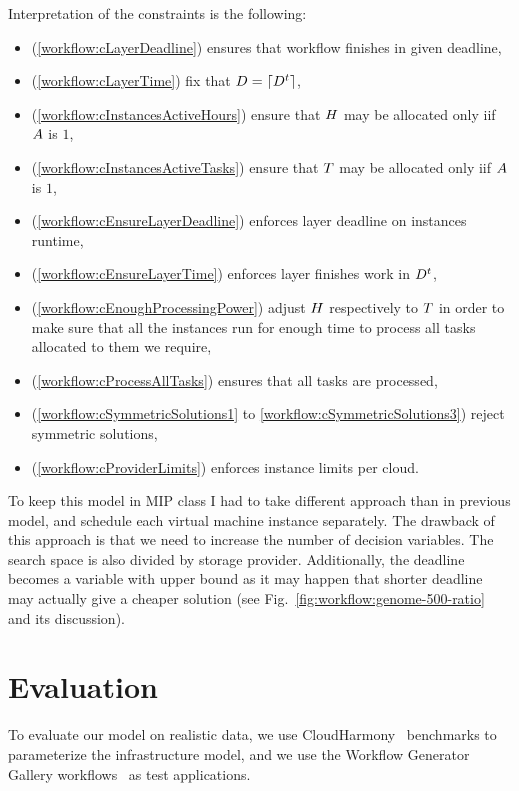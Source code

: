 {    Interpretation of the constraints is the following:
    \begin{itemize}
        \item(\ref{workflow:cLayerDeadline}) ensures that workflow finishes in given deadline,
        \item(\ref{workflow:cLayerTime}) fix that $D = \lceil D^t\rceil$,
        \item(\ref{workflow:cInstancesActiveHours}) ensure that $H$ may be allocated only iif $A$ is $1$,
        \item(\ref{workflow:cInstancesActiveTasks}) ensure that $T$ may be allocated only iif $A$ is $1$,
        \item(\ref{workflow:cEnsureLayerDeadline}) enforces layer deadline on instances runtime,
        \item(\ref{workflow:cEnsureLayerTime}) enforces layer finishes work in $D^t$,
        \item(\ref{workflow:cEnoughProcessingPower}) adjust $H$ respectively to $T$ in order to make sure that all the instances run for enough time to process all tasks allocated to them we require,
        \item(\ref{workflow:cProcessAllTasks}) ensures that all tasks are processed,
        \item(\ref{workflow:cSymmetricSolutions1} to \ref{workflow:cSymmetricSolutions3}) reject symmetric solutions,
        \item(\ref{workflow:cProviderLimits}) enforces instance limits per cloud.
    \end{itemize}
    
    To keep this model in MIP class I had to take different approach than in previous model, and schedule each virtual machine instance separately. The drawback of this approach is that we need to increase the number of decision variables. The search space is also divided by storage provider. Additionally, the deadline becomes a variable with upper bound as it may happen that shorter deadline may actually give a cheaper solution (see Fig.~\ref{fig:workflow:genome-500-ratio} and its discussion).
    
    
    \section{Evaluation}
    \label{sec:workflow:evaluation}

    To evaluate our model on realistic data, we use CloudHarmony~\cite{CloudHarmony} benchmarks to parameterize the infrastructure model, and we use the Workflow  Generator Gallery workflows~\cite{Bharathi08} as test applications.

}
